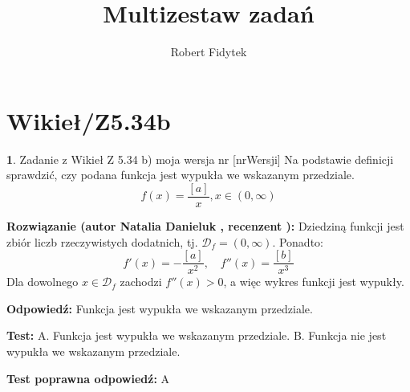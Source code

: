 \documentclass[12pt, a4paper]{article}
\title{Multizestaw zadań}
\author{Robert Fidytek}
\date{}
\theoremstyle{definition} %
\newtheorem{zad}{}
\newcommand{\kategoria}[1]{\section{#1}} %
\newcommand{\zadStart}[1]{\begin{zad}#1\newline} %
\newcommand{\zadStop}{\end{zad}}   %
\newcommand{\rozwStart}[2]{\noindent \textbf{Rozwiązanie (autor #1 , recenzent #2): }\newline} %
\newcommand{\rozwStop}{\newline}                                            %
\newcommand{\odpStart}{\noindent \textbf{Odpowiedź:}\newline}    %
\newcommand{\odpStop}{\newline}                                             %
\newcommand{\testStart}{\noindent \textbf{Test:}\newline} %
\newcommand{\testStop}{\newline} %
\newcommand{\kluczStart}{\noindent \textbf{Test poprawna odpowiedź:}\newline} %
\newcommand{\kluczStop}{\newline} %
\begin{document}
\maketitle

\kategoria{Wikieł/Z5.34b}

\zadStart{Zadanie z Wikieł Z 5.34 b) moja wersja nr [nrWersji]}
Na podstawie definicji sprawdzić, czy podana funkcja jest wypukła we wskazanym przedziale.
$$f(x) = \frac{[a]}{x}, x \in (0,\infty)$$
\zadStop

\rozwStart{Natalia Danieluk}{}
Dziedziną funkcji jest zbiór liczb rzeczywistych dodatnich, tj. $\mathcal{D}_f=(0,\infty)$. Ponadto:
$$f'(x) = -\frac{[a]}{x^2},\quad f''(x) = \frac{[b]}{x^3}$$
Dla dowolnego $x \in \mathcal{D}_f$ zachodzi $f''(x) > 0$, a więc wykres funkcji jest wypukły.
\rozwStop

\odpStart
Funkcja jest wypukła we wskazanym przedziale.
\odpStop

\testStart
A. Funkcja jest wypukła we wskazanym przedziale.
B. Funkcja nie jest wypukła we wskazanym przedziale.
\testStop

\kluczStart
A
\kluczStop
\end{document}
